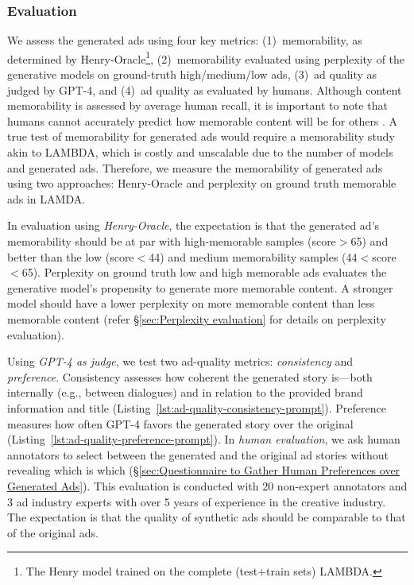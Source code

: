 \subsubsection{Evaluation} 
We assess the generated ads using four key metrics: (1)~memorability, as determined by Henry-Oracle\footnote{The Henry model trained on the complete (test+train sets) LAMBDA.}, (2)~memorability evaluated using perplexity of the generative models on ground-truth high/medium/low ads, (3)~ad quality as judged by GPT-4, and (4)~ad quality as evaluated by humans. Although content memorability is assessed by average human recall, it is important to note that humans cannot accurately predict how memorable content will be for others \cite{isola2013makes}. A true test of memorability for generated ads would require a memorability study akin to LAMBDA, which is costly and unscalable due to the number of models and generated ads. Therefore, we measure the memorability of generated ads using two approaches: Henry-Oracle and perplexity on ground truth memorable ads in LAMDA. 

In evaluation using \textit{Henry-Oracle}, the expectation is that the generated ad's memorability should be at par with high-memorable samples (score$>$65) and better than the low (score$<$44) and medium memorability samples (44$<$score$<$65). Perplexity on ground truth low and high memorable ads evaluates the generative model's propensity to generate more memorable content. A stronger model should have a lower perplexity on more memorable content than less memorable content (refer \S\ref{sec:Perplexity evaluation} for details on perplexity evaluation). 

Using \textit{GPT-4 as judge}, we test two ad-quality metrics: \textit{consistency} and \textit{preference}. 
Consistency assesses how coherent the generated story is—both internally (e.g., between dialogues) and in relation to the provided brand information and title (Listing~\ref{lst:ad-quality-consistency-prompt}). 
Preference measures how often GPT-4 favors the generated story over the original (Listing~\ref{lst:ad-quality-preference-prompt}). In \textit{human evaluation}, we ask human annotators to select between the generated and the original ad stories without revealing which is which (\S\ref{sec:Questionnaire to Gather Human Preferences over Generated Ads}). This evaluation is conducted with 20 non-expert annotators and 3 ad industry experts with over 5 years of experience in the creative industry. The expectation is that the quality of synthetic ads should be comparable to that of the original ads.

